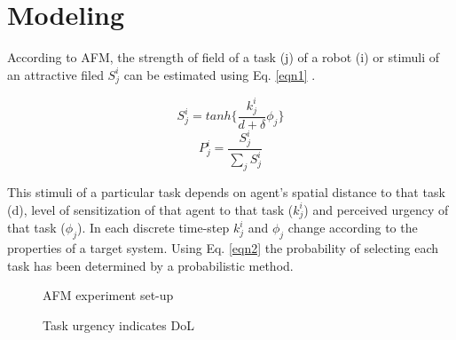 \documentclass{llncs}
\begin{document}
\section{Modeling}
\label{sec:model}
\vspace{2mm}
According to AFM, the strength of field of a task (j) of a robot (i) or stimuli of an attractive filed $S_{j}^{i}$ can be estimated using Eq. \ref{eqn1} .
\addtolength{\abovedisplayskip}{-10mm} 
\begin{scriptsize}
\begin{multicols}{2} 
\begin{equation}
S_{j}^{i} = tanh\{\frac{k_{j}^{i}}{d+\delta } \phi _{j}\}
\label{eqn1}
\end{equation}
\vspace*{0.25cm}
\begin{equation}
P_{j}^{i} = \frac{S_{j}^{i}}{\sum_{j}^{}S_{j}^{i}}
\label{eqn2}
\end{equation}
\end{multicols}
\end{scriptsize}
\vspace{2mm}
This stimuli of a particular task depends on agent's spatial distance to that task (d), level of sensitization of that agent to that task ($k_{j}^{i}$) and perceived urgency of that task ($\phi _{j}$). In each discrete time-step $k_{j}^{i}$ and $\phi _{j}$ change according to the properties of a target system. Using Eq. \ref{eqn2} the probability of selecting each task has been determined by a probabilistic method.
\addtolength{\floatsep}{-25mm}
\begin{figure}[ht]
\begin{minipage}[b]{0.55\linewidth}
\centering
\caption{AFM experiment set-up}
\label{fig:1} %
\end{minipage}
\begin{minipage}[b]{0.45\linewidth}
\centering
\caption{Task urgency indicates DoL }
\label{fig:2} %
\end{minipage}
\end{figure}
\end{document}
